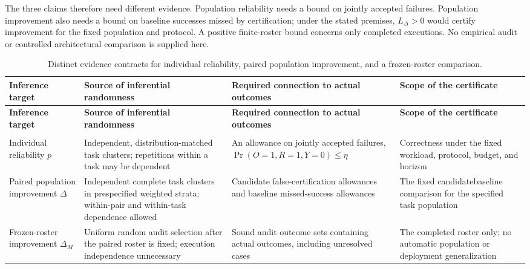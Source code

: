 \documentclass[11pt]{article}
\begin{document}
The three claims therefore need different evidence. Population reliability needs a bound on jointly accepted failures. Population improvement also needs a bound on baseline successes missed by certification; under the stated premises, $L_\Delta>0$ would certify improvement for the fixed population and protocol. A positive finite-roster bound concerns only completed executions. No empirical audit or controlled architectural comparison is supplied here.

\begin{longtable}{@{}>{\raggedright\arraybackslash}p{}>{\raggedright\arraybackslash}p{}>{\raggedright\arraybackslash}p{}>{\raggedright\arraybackslash}p{}@{}}
\caption{Distinct evidence contracts for individual reliability, paired population improvement, and a frozen-roster comparison.}\\
\toprule
\textbf{Inference target} & \textbf{Source of inferential randomness} & \textbf{Required connection to actual outcomes} & \textbf{Scope of the certificate}\\
\midrule
\endfirsthead
\toprule
\textbf{Inference target} & \textbf{Source of inferential randomness} & \textbf{Required connection to actual outcomes} & \textbf{Scope of the certificate}\\
\midrule
\endhead
\midrule
\multicolumn{4}{r}{\footnotesize Continued on next page}\\
\endfoot
\bottomrule
\endlastfoot
Individual reliability $p$ & Independent, distribution-matched task clusters; repetitions within a task may be dependent & An allowance on jointly accepted failures, $\Pr(O=1,R=1,Y=0)\leq\eta$ & Correctness under the fixed workload, protocol, budget, and horizon\\
Paired population improvement $\Delta$ & Independent complete task clusters in prespecified weighted strata; within-pair and within-task dependence allowed & Candidate false-certification allowances and baseline missed-success allowances & The fixed candidate\textendash{}\allowbreak{}baseline comparison for the specified task population\\
Frozen-roster improvement $\Delta_M$ & Uniform random audit selection after the paired roster is fixed; execution independence unnecessary & Sound audit outcome sets containing actual outcomes, including unresolved cases & The completed roster only; no automatic population or deployment generalization\\
\end{longtable}
\par{}
\end{document}
